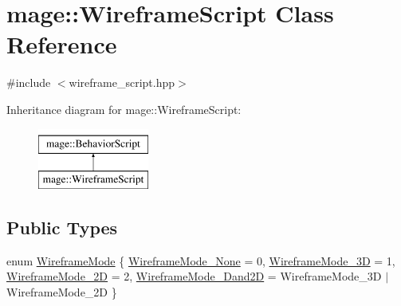 \hypertarget{classmage_1_1_wireframe_script}{}\section{mage\+:\+:Wireframe\+Script Class Reference}
\label{classmage_1_1_wireframe_script}


{\ttfamily \#include $<$wireframe\+\_\+script.\+hpp$>$}

Inheritance diagram for mage\+:\+:Wireframe\+Script\+:\begin{figure}[H]
\begin{center}
\leavevmode
\includegraphics[height=2.000000cm]{classmage_1_1_wireframe_script}
\end{center}
\end{figure}
\subsection*{Public Types}
\begin{DoxyCompactItemize}
\item 
enum \hyperlink{classmage_1_1_wireframe_script_a99d65e77e89c2581544e68030adcefb7}{Wireframe\+Mode} \{ \hyperlink{classmage_1_1_wireframe_script_a99d65e77e89c2581544e68030adcefb7aa514164404631f9c0854c9d2301eeadc}{Wireframe\+Mode\+\_\+\+None} = 0, 
\hyperlink{classmage_1_1_wireframe_script_a99d65e77e89c2581544e68030adcefb7acca763d53d11dca0dd2f7966759fffca}{Wireframe\+Mode\+\_\+3D} = 1, 
\hyperlink{classmage_1_1_wireframe_script_a99d65e77e89c2581544e68030adcefb7aa67ffa1dd860293f82b096ddc4dc32e2}{Wireframe\+Mode\+\_\+2D} = 2, 
\hyperlink{classmage_1_1_wireframe_script_a99d65e77e89c2581544e68030adcefb7a0b416a09d9944a160b2ab8be8f1be80c}{Wireframe\+Mode\+\_\+Dand2D} = Wireframe\+Mode\+\_\+3D $\vert$ Wireframe\+Mode\+\_\+2D
 \}
\end{DoxyCompactItemize}
